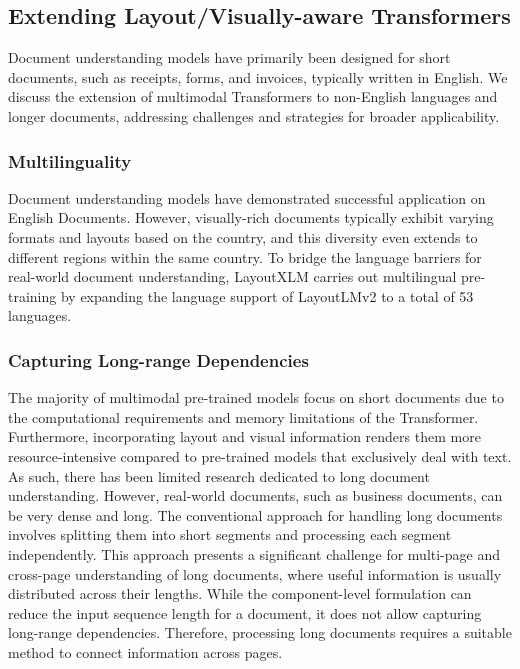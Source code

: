 \subsection{Extending Layout/Visually-aware Transformers}

Document understanding models have primarily been designed for short documents, such as receipts, forms, and invoices, typically written in English. We discuss the extension of multimodal Transformers to non-English languages and longer documents, addressing challenges and strategies for broader applicability.

\subsubsection{Multilinguality} 

Document understanding models have demonstrated successful application on English Documents. However, visually-rich documents typically exhibit varying formats and layouts based on the country, and this diversity even extends to different regions within the same country. To bridge the language barriers for real-world document understanding, LayoutXLM \citep{xu2021layoutxlm} carries out multilingual pre-training by expanding the language support of LayoutLMv2 to a total of 53 languages.

\subsubsection{Capturing Long-range Dependencies}

The majority of multimodal pre-trained models focus on short documents due to the computational requirements and memory limitations of the Transformer. Furthermore, incorporating layout and visual information renders them more resource-intensive compared to pre-trained models that exclusively deal with text. As such, there has been limited research dedicated to long document understanding. However, real-world documents, such as business documents, can be very dense and long. The conventional approach for handling long documents involves splitting them into short segments and processing each segment independently. This approach presents a significant challenge for multi-page and cross-page understanding of long documents, where useful information is usually distributed across their lengths. While the component-level formulation \citep{li2021structurallm, li2021selfdoc} can reduce the input sequence length for a document, it does not allow capturing long-range dependencies. Therefore, processing long documents requires a suitable method to connect information across pages.

